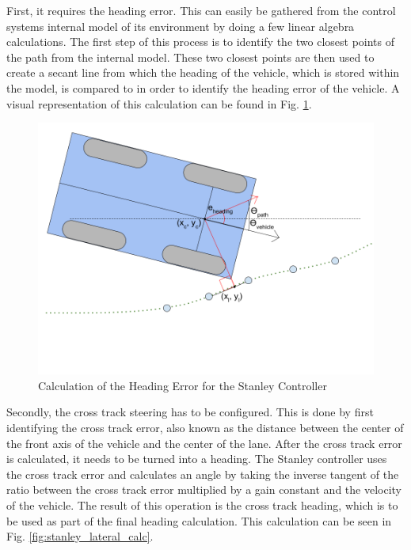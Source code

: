 \documentclass[titlepage,draft]{article}
\begin{document}
{First, it requires the heading error. This can easily be gathered from the control systems internal model of its environment by doing a few linear algebra calculations. The first step of this process is to identify the two closest points of the path from the internal model. These two closest points are then used to create a secant line from which the heading of the vehicle, which is stored within the model, is compared to in order to identify the heading error of the vehicle. A visual representation of this calculation can be found in Fig. \ref{fig:stanley_heading_calc}.

\begin{figure}
	\centering
	\includegraphics[width=5in]{stanley_heading_error}
	\caption{Calculation of the Heading Error for the Stanley Controller}
	\label{fig:stanley_heading_calc}
\end{figure}

Secondly, the cross track steering has to be configured. This is done by first identifying the cross track error, also known as the distance between the center of the front axis of the vehicle and the center of the lane. After the cross track error is calculated, it needs to be turned into a heading. The Stanley controller uses the cross track error and calculates an angle by taking the inverse tangent of the ratio between the cross track error multiplied by a gain constant and the velocity of the vehicle. The result of this operation is the cross track heading, which is to be used as part of the final heading calculation. This calculation can be seen in Fig. \ref{fig:stanley_lateral_calc}.

}
\end{document}
